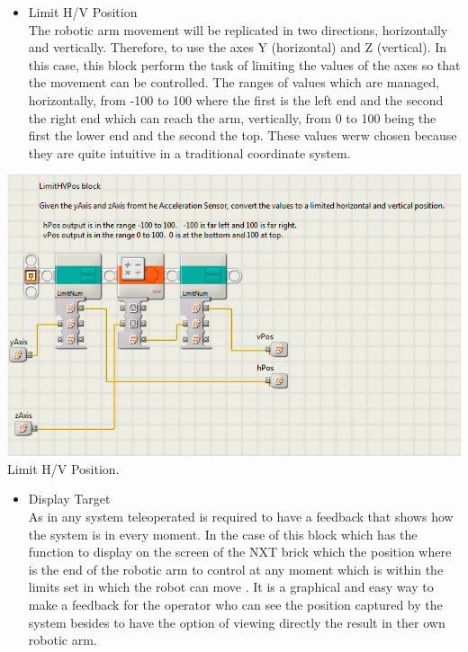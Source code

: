 \documentclass[a4paper,11pt]{article}
\begin{document}
	\begin{multicols}{2}

			\begin{itemize}
				\item Limit H/V Position\\
				
				The robotic arm movement will be replicated in two directions, horizontally and vertically. Therefore,  to use the axes Y (horizontal) and Z (vertical). In this case, this block perform the task of limiting the values of the axes so that the movement can be controlled. The ranges of values which are managed, horizontally, from -100 to 100 where the first is the left end and the second the right end which can reach the arm, vertically, from 0 to 100 being the first the lower end and the second the top. These values werw chosen because they are quite intuitive in a traditional coordinate system.
			\end{itemize}

	\end{multicols}

			\begin{center}
				\includegraphics[scale=0.8]{img/SW_LimitHVPos.png}\\
				Limit H/V Position.
			\end{center}

	\begin{multicols}{2}

			\begin{itemize}
				\item Display Target\\
				
				As in any system teleoperated is required to have a feedback that shows how the system is in every moment. In the case of this block which has the function to display on the screen of the NXT brick which the position where is the end of the robotic arm to control at any moment which is within the limits set in which the robot can move . It is a graphical and easy way to make a feedback for the operator who can see the position captured by the system besides to have the option of viewing directly the result in ther own robotic arm.
			\end{itemize}

	\end{multicols}
\end{document}

